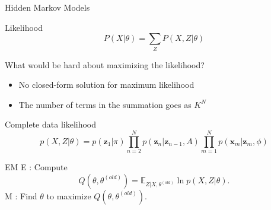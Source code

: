 \documentclass[10pt]{beamer}
\begin{document}
\begin{frame}{Hidden Markov Models}
\begin{sblock}{Likelihood}
$$P(X| \theta) = \sum_{Z} P(X, Z | \theta)$$
\end{sblock}

\begin{sblock}{What would be hard about maximizing the likelihood?}
\begin{itemize}
\item No closed-form solution for maximum likelihood
\item The number of terms in the summation goes as $K^N$
\end{itemize}
\end{sblock}


\end{frame}

\begin{frame}
\begin{sblock}{Complete data likelihood}
$$p(X, Z | \theta) = p(\mathbf{z}_1| \pi) \prod_{n=2}^N p(\mathbf{z}_n | \mathbf{z}_{n-1}, A) \prod_{m=1}^N p(\mathbf{x}_m | \mathbf{z}_m, \phi)$$
\end{sblock} 
\begin{sblock}{EM}
E : Compute $$Q(\theta, \theta^{(old)}) = \mathbb{E}_{Z | X, \theta^{(old)}} \ln p(X, Z | \theta).$$
M : Find $\theta$ to maximize $Q(\theta, \theta^{(old)})$.
\end{sblock}
\end{frame}
\end{document}
